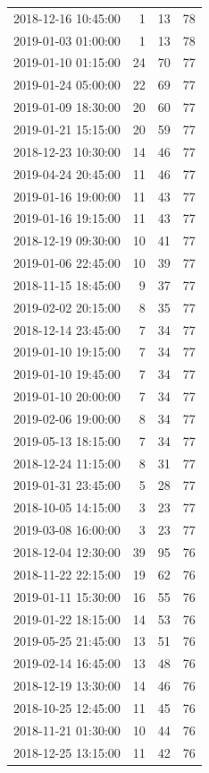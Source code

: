 \begin{tabular}{lrrr}
2018-12-16 10:45:00 & 1 & 13 & 78 \\
2019-01-03 01:00:00 & 1 & 13 & 78 \\
2019-01-10 01:15:00 & 24 & 70 & 77 \\
2019-01-24 05:00:00 & 22 & 69 & 77 \\
2019-01-09 18:30:00 & 20 & 60 & 77 \\
2019-01-21 15:15:00 & 20 & 59 & 77 \\
2018-12-23 10:30:00 & 14 & 46 & 77 \\
2019-04-24 20:45:00 & 11 & 46 & 77 \\
2019-01-16 19:00:00 & 11 & 43 & 77 \\
2019-01-16 19:15:00 & 11 & 43 & 77 \\
2018-12-19 09:30:00 & 10 & 41 & 77 \\
2019-01-06 22:45:00 & 10 & 39 & 77 \\
2018-11-15 18:45:00 & 9 & 37 & 77 \\
2019-02-02 20:15:00 & 8 & 35 & 77 \\
2018-12-14 23:45:00 & 7 & 34 & 77 \\
2019-01-10 19:15:00 & 7 & 34 & 77 \\
2019-01-10 19:45:00 & 7 & 34 & 77 \\
2019-01-10 20:00:00 & 7 & 34 & 77 \\
2019-02-06 19:00:00 & 8 & 34 & 77 \\
2019-05-13 18:15:00 & 7 & 34 & 77 \\
2018-12-24 11:15:00 & 8 & 31 & 77 \\
2019-01-31 23:45:00 & 5 & 28 & 77 \\
2018-10-05 14:15:00 & 3 & 23 & 77 \\
2019-03-08 16:00:00 & 3 & 23 & 77 \\
2018-12-04 12:30:00 & 39 & 95 & 76 \\
2018-11-22 22:15:00 & 19 & 62 & 76 \\
2019-01-11 15:30:00 & 16 & 55 & 76 \\
2019-01-22 18:15:00 & 14 & 53 & 76 \\
2019-05-25 21:45:00 & 13 & 51 & 76 \\
2019-02-14 16:45:00 & 13 & 48 & 76 \\
2018-12-19 13:30:00 & 14 & 46 & 76 \\
2018-10-25 12:45:00 & 11 & 45 & 76 \\
2018-11-21 01:30:00 & 10 & 44 & 76 \\
2018-12-25 13:15:00 & 11 & 42 & 76 \\

\end{tabular}
